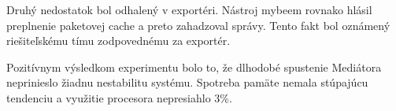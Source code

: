 Druhý nedostatok bol odhalený v exportéri. Nástroj mybeem rovnako hlásil preplnenie paketovej cache a 
preto zahadzoval správy. Tento fakt bol oznámený riešiteľskému tímu zodpovednému za exportér.

Pozitívnym výsledkom experimentu bolo to, že dlhodobé spustenie Mediátora neprinieslo žiadnu nestabilitu 
systému. Spotreba pamäte nemala stúpajúcu tendenciu a využitie procesora nepresiahlo 3\%.




























